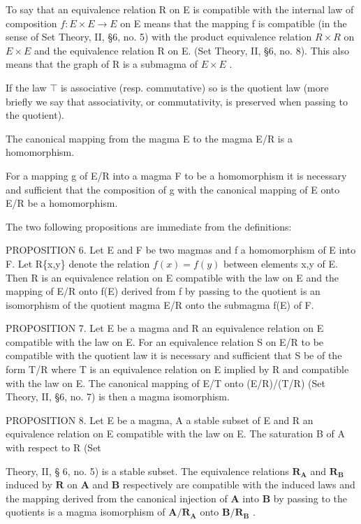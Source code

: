 To say that an equivalence relation R on E is compatible with the internal law of composition \(f: E \times E \to E\) on E means that the mapping f is compatible (in the sense of Set Theory, II, §6, no. 5) with the product equivalence relation \(R \times R\) on \(E \times E\) and the equivalence relation R on E. (Set Theory, II, §6, no. 8). This also means that the graph of R is a submagma of \(E \times E\) .

If the law \(\top\) is associative (resp. commutative) so is the quotient law (more briefly we say that associativity, or commutativity, is preserved when passing to the quotient).

The canonical mapping from the magma E to the magma E/R is a homomorphism.

For a mapping g of E/R into a magma F to be a homomorphism it is necessary and sufficient that the composition of g with the canonical mapping of E onto E/R be a homomorphism.

The two following propositions are immediate from the definitions:

PROPOSITION 6. Let E and F be two magmas and f a homomorphism of E into F. Let R\{x,y\} denote the relation \(f(x)=f(y)\) between elements x,y of E. Then R is an equivalence relation on E compatible with the law on E and the mapping of E/R onto f(E) derived from f by passing to the quotient is an isomorphism of the quotient magma E/R onto the submagma f(E) of F.

PROPOSITION 7. Let E be a magma and R an equivalence relation on E compatible with the law on E. For an equivalence relation S on E/R to be compatible with the quotient law it is necessary and sufficient that S be of the form T/R where T is an equivalence relation on E implied by R and compatible with the law on E. The canonical mapping of E/T onto (E/R)/(T/R) (Set Theory, II, §6, no. 7) is then a magma isomorphism.

PROPOSITION 8. Let E be a magma, A a stable subset of E and R an equivalence relation on E compatible with the law on E. The saturation B of A with respect to R (Set

Theory, II, § 6, no. 5) is a stable subset. The equivalence relations \(\mathbf{R}_{\mathbf{A}}\) and \(\mathbf{R}_{\mathbf{B}}\) induced by \(\mathbf{R}\) on \(\mathbf{A}\) and \(\mathbf{B}\) respectively are compatible with the induced laws and the mapping derived from the canonical injection of \(\mathbf{A}\) into \(\mathbf{B}\) by passing to the quotients is a magma isomorphism of \(\mathbf{A} / \mathbf{R}_{\mathbf{A}}\) onto \(\mathbf{B} / \mathbf{R}_{\mathbf{B}}\) .

